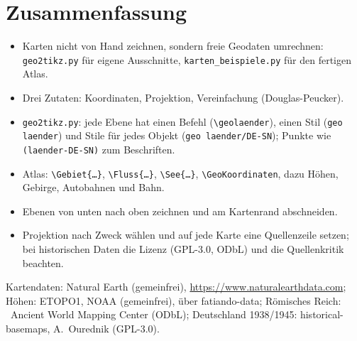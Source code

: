 \section{Zusammenfassung}

\begin{itemize}
	\item Karten nicht von Hand zeichnen, sondern freie Geodaten umrechnen: \texttt{geo2tikz.py} für eigene Ausschnitte, \texttt{karten\_beispiele.py} für den fertigen Atlas.
	\item Drei Zutaten: Koordinaten, Projektion, Vereinfachung (Douglas-Peucker).
	\item \texttt{geo2tikz.py}: jede Ebene hat einen Befehl (\texttt{\textbackslash geolaender}), einen Stil (\texttt{geo laender}) und Stile für jedes Objekt (\texttt{geo laender/DE-SN}); Punkte wie \texttt{(laender-DE-SN)} zum Beschriften.
	\item Atlas: \texttt{\textbackslash Gebiet\{\dots\}}, \texttt{\textbackslash Fluss\{\dots\}}, \texttt{\textbackslash See\{\dots\}}, \texttt{\textbackslash GeoKoordinaten}, dazu Höhen, Gebirge, Autobahnen und Bahn.
	\item Ebenen von unten nach oben zeichnen und am Kartenrand abschneiden.
	\item Projektion nach Zweck wählen und auf jede Karte eine Quellenzeile setzen; bei historischen Daten die Lizenz (GPL-3.0, ODbL) und die Quellenkritik beachten.
\end{itemize}

\vfill
{\footnotesize\raggedright Kartendaten: Natural Earth (gemeinfrei), \url{https://www.naturalearthdata.com}; Höhen: ETOPO1, NOAA (gemeinfrei), über fatiando-data; Römisches Reich: \textcopyright\ Ancient World Mapping Center (ODbL); Deutschland 1938/1945: historical-basemaps, A.~Ourednik (GPL-3.0).}


